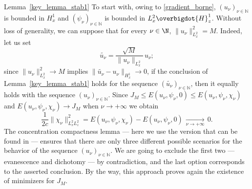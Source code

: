 \begin{ProofOf}{Lemma~\ref{key_lemma_stab1}}
To start with, owing to \eqref{gradient_borne}, $(u_{\nu})_{\nu\in\mathbb N}$ is bounded in $H_{x}^{1}$ and $(\psi_{\nu})_{\nu\in\mathbb N}$ is bounded in $L_{x}^{2}\overbigdot{H}_{z}^{1}$.
Without loss of generality, we can suppose that for every $\nu\in\N$, $\|u_{\nu}\|_{L_{x}^{2}}^{2}=M$. Indeed, let us set\vspace*{-3pt}
\[
\widetilde{u_{\nu}}=\frac{\sqrt{M}}{\|u_{\nu}\|_{L_{x}^{2}}}\,u_{\nu};
\]
since $\|u_{\nu}\|_{L_{x}^{2}}^{2}\to M$ implies $\|\widetilde{u_{\nu}}-u_{\nu}\|_{H_{x}^{1}}\to 0$, if the conclusion of Lemma~\ref{key_lemma_stab1} holds for the sequence $(\widetilde{u_{\nu}})_{\nu\in \mathbb N}$, then it equally holds with the sequence $(u_{\nu})_{\nu\in \mathbb N}$.
Since $J_{M}\leq E(u_{\nu},\psi_{\nu},0)\leq E(u_{\nu},\psi_{\nu},\chi_{\nu})$ and $E(u_{\nu},\psi_{\nu},\chi_{\nu})\to J_{M}$ when $\nu\to+\infty$ we obtain\vspace*{-3pt}
\[
\frac{1}{2c}\|\chi_{\nu}\|_{L_{x}^{2}L_{z}^{2}}^{2}=E(u_{\nu},\psi_{\nu},\chi_{\nu})-E(u_{\nu},\psi_{\nu},0)\,\underset{\nu\to +\infty}{\to}\,0.
\]
The concentration compactness lemma \cite{PLLcc1, PLLcc2} --- here we use the version that can be found in \cite[Prop.\,1.7.6]{Caze} --- ensures that there are only three different possible scenarios for the behavior of the sequence $(u_{\nu})_{\nu\in\mathbb N}$.
We are going to exclude the first two --- evanescence and dichotomy --- by contradiction, and the last option corresponds to the asserted conclusion.
By the way, this approach proves again the existence of minimizers for $J_M$.


\end{ProofOf}
